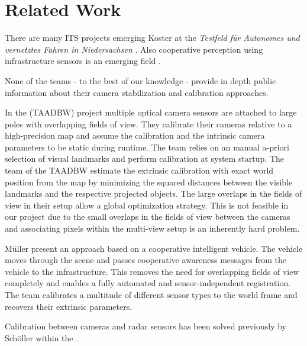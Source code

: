 \section{Related Work}
There are many ITS projects emerging \eg{} Koster \etal{} at the \emph{Testfeld für Autonomes und vernetztes Fahren in Niedersachsen} \cite{koster2017testfeld}. 
Also cooperative perception using infrastructure sensors is an emerging field \cite{arnold2020cooperative}.

None of the teams - to the best of our knowledge - provide in depth public information about their camera stabilization and calibration approaches.

In the \TAADBW{} (TAADBW) project multiple optical camera sensors are attached to large poles with overlapping fields of view.
They calibrate their cameras relative to a high-precision map and assume the calibration and the intrinsic camera parameters to be static during runtime. 
The team relies on an manual a-priori selection of visual landmarks and perform calibration at system startup.  
The team of the TAADBW estimate the extrinsic calibration with exact world position from the map by minimizing the squared distances between the visible landmarks and the respective projected objects.
The large overlaps in the fields of view in their setup allow a global optimization strategy. 
This is not feasible in our project due to the small overlaps in the fields of view between the cameras \cite{kraemmer2020providentia} and associating pixels within the multi-view setup is an inherently hard problem. 

Müller \etal{} \cite{laciMueller} present an approach based on a cooperative intelligent vehicle.
The vehicle moves through the scene and passes cooperative awareness messages from the vehicle to the infrastructure. 
This removes the need for overlapping fields of view completely and enables a fully automated and sensor-independent registration.
The team calibrates a multitude of different sensor types to the world frame and recovers their extrinsic parameters. 

Calibration between cameras and radar sensors has been solved previously by Schöller \etal{} within the \Providentia{}.